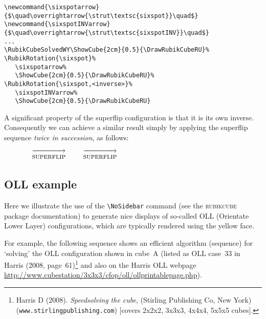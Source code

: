 \documentclass[a4paper]{article}
\begin{document}
\begin{verbatim}
\newcommand{\sixspotarrow}{$\quad\overrightarrow{\strut\textsc{sixspot}}\quad$}
\newcommand{\sixspotINVarrow}{$\quad\overrightarrow{\strut\textsc{sixspotINV}}\quad$}
...
\RubikCubeSolvedWY\ShowCube{2cm}{0.5}{\DrawRubikCubeRU}% 
\RubikRotation{\sixspot}%   
   \sixspotarrow%
   \ShowCube{2cm}{0.5}{\DrawRubikCubeRU}%
\RubikRotation{\sixspot,<inverse>}%  
   \sixspotINVarrow%
   \ShowCube{2cm}{0.5}{\DrawRubikCubeRU}
\end{verbatim}


A significant property of the superflip configuration is that it is its own 
inverse. Consequently we can achieve  a similar result simply by applying the 
superflip sequence \textit{twice in succession}, as follows:

\newcommand{\superfliparrow}{$\quad\overrightarrow{\strut\textsc{superflip}}\quad$}

\begin{figure}[hbt]
\centering
\RubikCubeSolved%
   \superfliparrow%
\RubikRotation{\superflip}%
   \superfliparrow%
\RubikRotation{\superflip}%
\end{figure}


\pagebreak

\subsection{OLL example}

\newcommand{\yellowcross}{[yellowcross],F,R,U,Rp,Up,Fp}
\newcommand{\arrow}[1]{$\overrightarrow{\strut\mbox{#1}}$}
\newcommand{\ShowYellowFace}{\ShowCube{2.6cm}{0.6}{\NoSidebar{X}\DrawRubikFaceUpSide}}

Here we illustrate the use of the \verb!\NoSidebar! command (see the 
\textsc{rubikcube} package documentation) to generate nice displays 
of so-called OLL (Orientate Lower Layer) configurations, which are 
typically rendered using the yellow face.

For example, the following sequence shows an efficient 
algorithm (sequence) for `solving'  the OLL configuration shown 
in cube~A (listed as OLL case~33 in Harris 
(2008,  page~61)\footnote{Harris D (2008). \textit{Speedsolving the cube}, 
(Stirling Publishing Co, New York) {\newline}(\texttt{www.stirlingpublishing.com}) 
[covers 2x2x2, 3x3x3, 4x4x4, 5x5x5  cubes].}  and also on the Harris  OLL webpage  \url{http://www.cubestation/3x3x3/cfop/oll/ollprintablepage.php}).
\end{document}
